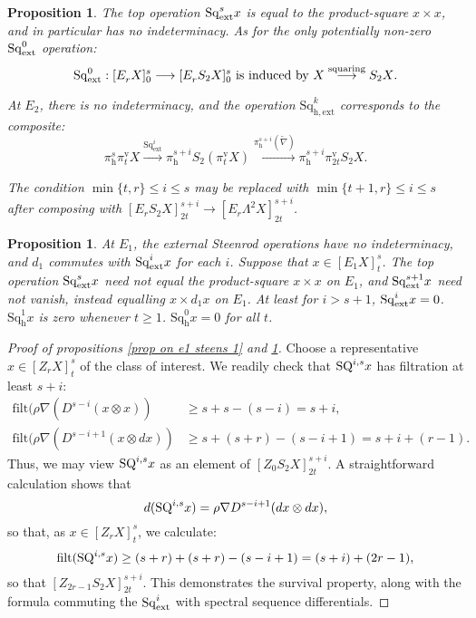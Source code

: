 \documentclass[11pt]{amsart} \renewcommand{\baselinestretch}{1.2}
\theoremstyle{plain}
\newtheorem{prop}[thm]{Proposition}
\numberwithin{equation}{section} %
\theoremstyle{plain}
\newtheorem{prop}[thm]{Proposition}
\numberwithin{equation}{chapter} %
\renewcommand{\to}{\longrightarrow}
\newcommand{\ExtCohOp}{\mathrm{Sq}_\mathrm{ext}}
\newcommand{\hExtCohOp}{\mathrm{Sq}_\mathrm{h,ext}}
\newcommand{\Nabla}{\nabla}
\newcommand{\Sq}{\mathrm{Sq}}
\newcommand{\Edownup}[5]{[E_{#1}^{#2}#3]^{#4}_{#5}}
\newcommand{\EZdownup}[5]{[Z^{#2}_{#1}#3]^{#4}_{#5}}
\newcommand{\filt}{\mathrm{filt}}
\newcommand{\uver}{^\mathrm{v}}
\newcommand{\dhor}{_\mathrm{h}}
\newcommand{\Sqh}{\mathrm{Sq}\dhor}
\begin{document}
\begin{second quadrant homotopy sseq operations}
\begin{prop}
The \emph{top operation} $\Sq^s_\textup{ext}x$ is equal to the product-square $x\times x$, and in particular has no indeterminacy. 
As for the only potentially non-zero $\Sq^0_\textup{ext}$ operation:
\[\Sq^0_\textup{ext}:\Edownup{r}{}{X}{s}{0}\to \Edownup{r}{}{S_2X}{s}{0}\textup{ is induced by $X\overset{\textup{squaring}}{\to}S_2X$}.\]

At $E_2$, there is no indeterminacy, and the operation $\hExtCohOp^k$ corresponds to the composite:
\[\pi\dhor^s\pi\uver_t X
\overset{\ExtCohOp^i}{\to} 
\pi\dhor^{s+i}S_2(\pi\uver_t X)
\overset{\pi\dhor^{s+i}(\widetilde{\nabla})}{\to}
\pi\dhor^{s+i}\pi\uver_{2t}S_2 X.
\]

The condition $\min\{t,r\}\leq i\leq s$ may be replaced with $\min\{t+1,r\}\leq i\leq s$ after composing with $\Edownup{r}{}{S_2X}{s+i}{2t}\to \Edownup{r}{}{\Lambda^2X}{s+i}{2t}$.
\end{prop}

\begin{prop}
\label{prop on e1 steens 2}
At $E_1$, the external Steenrod operations have no indeterminacy, and $d_{1}$ commutes with $\Sq^i_\textup{ext}x $ for each $i$. Suppose that $x\in \Edownup{1}{}{X}{s}{t}$.
The top operation $\Sq^s_\textup{ext}x$ \emph{need not} equal the product-square $x\times x$ on $E_1$, and
$\Sq^{s+1}_\textup{ext}x$ \emph{need not} vanish, instead equalling $x\times d_1x$ on $E_1$.
At least for $i>s+1$, $\Sq^i_\textup{ext}x=0$. $\Sqh^1x$ is zero whenever $t\geq1$. $\Sqh^0x=0$ for all $t$.
\end{prop}








\begin{proof}[Proof of propositions \ref{prop on e1 steens 1} and \ref{prop on e1 steens 2}]
Choose a representative $x\in \EZdownup{r}{}{X}{s}{t}$ of the class of interest. We readily check that $\textup{SQ}^{i,s}x$ has filtration at least $s+i$:
\begin{align*}
\filt(\rho\Nabla (D^{s-i}(x\otimes x))&\geq s+s-(s-i)=s+i,\\
\filt(\rho\Nabla (D^{s-i+1}(x\otimes dx))&\geq s+(s+r)-(s-i+1)=s+i+(r-1).
\end{align*}
Thus, we may view $\textup{SQ}^{i,s}x$ as an element of $\EZdownup{0}{}{S_2X}{s+i}{2t}$. 
A straightforward calculation shows that \[d(\textup{SQ}^{i,s}x)=\rho\Nabla D^{s-i+1}(dx\otimes dx),\] so that, as $x\in \EZdownup{r}{}{X}{s}{t}$, we calculate:
\[\filt(\textup{SQ}^{i,s}x)\geq (s+r)+(s+r)-(s-i+1)=(s+i)+(2r-1),\]
so that $\EZdownup{2r-1}{}{S_2X}{s+i}{2t}$. This demonstrates the survival property, along with the formula commuting the $\Sq^i_\textup{ext}$ with spectral sequence differentials.


\end{proof}
\end{second quadrant homotopy sseq operations}
\end{document}
